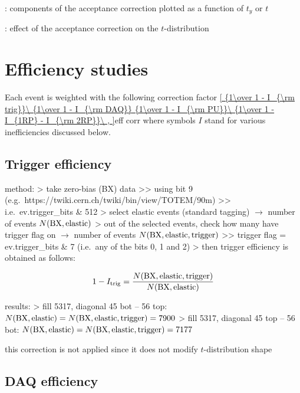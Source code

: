 \> : components of the acceptance correction plotted as a function of $t_y$ or $t$

\> : effect of the acceptance correction on the $t$-distribution



\chapter[efficiency]{Efficiency studies}

\iffalse

\vskip3mm
Each event is weighted with the following correction factor
\eqref{
	{1\over 1 - I_{\rm trig}}\ 
	{1\over 1 - I_{\rm DAQ}}
	{1\over 1 - I_{\rm PU}}\ 
	{1\over 1 - I_{1RP} - I_{\rm 2RP}}\ ,
}{eff corr}
where symbols $I$ stand for various inefficiencies discussed below.

\section[efficiency-trigger]{Trigger efficiency}

\> method:
\>> take zero-bias (BX) data
\>>> using bit 9 (e.g.~https://twiki.cern.ch/twiki/bin/view/TOTEM/90m)
\>>> i.e.~ev.trigger\_bits \& 512
\>> select elastic events (standard tagging) $\rightarrow$ number of events $N({\rm BX,elastic})$
\>> out of the selected events, check how many have trigger flag on $\rightarrow$ number of events $N({\rm BX,elastic,trigger})$
\>>> trigger flag = ev.trigger\_bits \& 7 (i.e.~any of the bits 0, 1 and 2)
\>> then trigger efficiency is obtained as follows:

$$1 - I_{\rm trig} = {N({\rm BX,elastic,trigger}) \over N({\rm BX,elastic})}$$

\> results:
\>> fill 5317, diagonal 45 bot -- 56 top: $N({\rm BX,elastic}) = N({\rm BX,elastic,trigger}) = 7900$
\>> fill 5317, diagonal 45 top -- 56 bot: $N({\rm BX,elastic}) = N({\rm BX,elastic,trigger}) = 7177$

\> this correction is not applied since it does not modify $t$-distribution shape


\section[efficiency-trigger]{DAQ efficiency}

